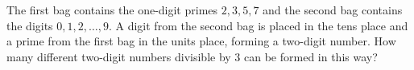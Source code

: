 The first bag contains the one-digit primes $2,3,5,7$ and the second bag contains the digits $0,1,2,\dots,9$. A digit from the second bag is placed in the tens place and a prime from the first bag in the units place, forming a two-digit number. How many different two-digit numbers divisible by $3$ can be formed in this way?
